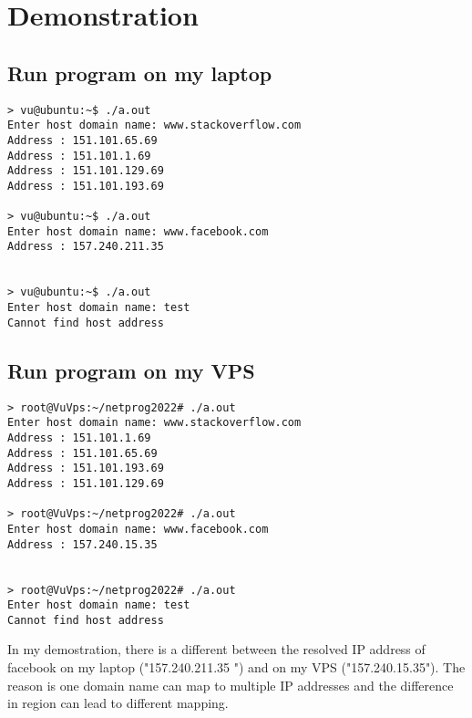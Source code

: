 \documentclass[12pt]{article}
\begin{document}
\section{Demonstration}
\subsection{Run program on my laptop}
\begin{verbatim}
> vu@ubuntu:~$ ./a.out
Enter host domain name: www.stackoverflow.com
Address : 151.101.65.69 
Address : 151.101.1.69 
Address : 151.101.129.69 
Address : 151.101.193.69 

> vu@ubuntu:~$ ./a.out 
Enter host domain name: www.facebook.com
Address : 157.240.211.35 


> vu@ubuntu:~$ ./a.out 
Enter host domain name: test
Cannot find host address 

\end{verbatim}
\subsection{Run program on my VPS}
\begin{verbatim}
> root@VuVps:~/netprog2022# ./a.out 
Enter host domain name: www.stackoverflow.com
Address : 151.101.1.69 
Address : 151.101.65.69 
Address : 151.101.193.69 
Address : 151.101.129.69 

> root@VuVps:~/netprog2022# ./a.out 
Enter host domain name: www.facebook.com
Address : 157.240.15.35 


> root@VuVps:~/netprog2022# ./a.out 
Enter host domain name: test    
Cannot find host address 
\end{verbatim}

In my demostration, there is a different between the resolved IP address of facebook on my laptop ("157.240.211.35 ") and on my VPS ("157.240.15.35"). The reason is one domain name can map to multiple IP addresses and the difference in region can lead to different mapping.
\end{document}
